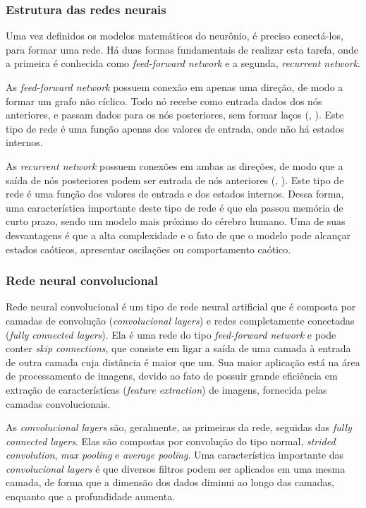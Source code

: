 \documentclass[]{politex}
\begin{document}
\subsubsection{Estrutura das redes neurais}
Uma vez definidos os modelos matemáticos do neurônio, é preciso conectá-los, para formar uma rede. Há duas formas fundamentais de realizar esta tarefa, onde a primeira é conhecida como \textit{feed-forward network} e a segunda, \textit{recurrent network}.

As \textit{feed-forward network} possuem conexão em apenas uma direção, de modo a formar um grafo não cíclico. Todo nó recebe como entrada dados dos nós anteriores, e passam dados para os nós posteriores, sem formar laços (, \citeyear{Russell}). Este tipo de rede é uma função apenas dos valores de entrada, onde não há estados internos.

As \textit{recurrent network} possuem conexões em ambas as direções, de modo que a saída de nós posteriores podem ser entrada de nós anteriores (, \citeyear{Russell}). Este tipo de rede é uma função dos valores de entrada e dos estados internos. Dessa forma, uma característica importante deste tipo de rede é que ela passou memória de curto prazo, sendo um modelo mais próximo do cérebro humano. Uma de suas desvantagens é que a alta complexidade e o fato de que o modelo pode alcançar estados caóticos, apresentar oscilações ou comportamento caótico.

\subsubsection{Rede neural convolucional}
Rede neural convolucional é um tipo de rede neural artificial que é composta por camadas de convolução (\textit{convolucional layers}) e redes completamente conectadas (\textit{fully connected layers}). Ela é uma rede do tipo \textit{feed-forward network} e pode conter \textit{skip connections}, que consiste em ligar a saída de uma camada à entrada de outra camada cuja distância é maior que um. Sua maior aplicação está na área de processamento de imagens, devido ao fato de possuir grande eficiência em extração de características (\textit{feature extraction}) de imagens, fornecida pelas camadas convolucionais.

As \textit{convolucional layers} são, geralmente, as primeiras da rede, seguidas das \textit{fully connected layers}. Elas são compostas por convolução do tipo normal, \textit{strided convolution}, \textit{max pooling} e \textit{average pooling}. Uma característica importante das \textit{convolucional layers} é que diversos filtros podem ser aplicados em uma mesma camada, de forma que a dimensão dos dados diminui ao longo das camadas, enquanto que a profundidade aumenta.
\end{document}
